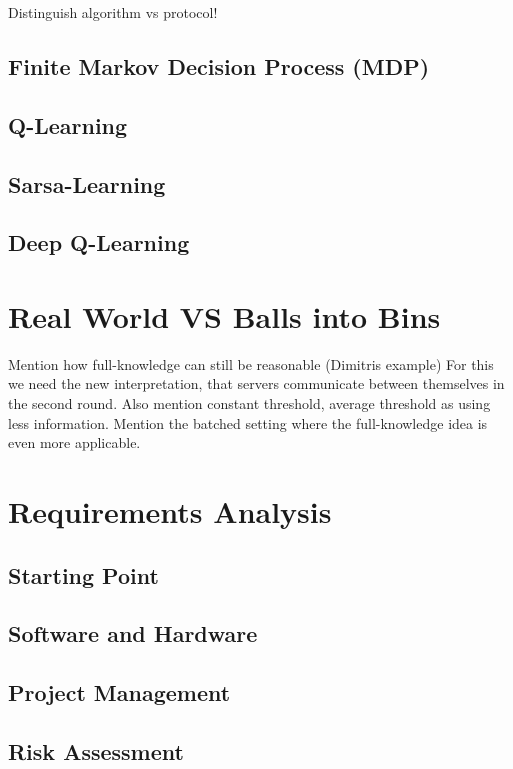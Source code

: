 Distinguish algorithm vs protocol!


\subsection{Finite Markov Decision Process (MDP)}


\subsection{Q-Learning}


\subsection{Sarsa-Learning}


\subsection{Deep Q-Learning}


\section{Real World VS Balls into Bins} \label{alternative}


Mention how full-knowledge can still be reasonable (Dimitris example)
For this we need the new interpretation, that servers communicate between themselves in the second round.
Also mention constant threshold, average threshold as using less information.
Mention the batched setting where the full-knowledge idea is even more applicable.


\section{Requirements Analysis}


\subsection{Starting Point}


\subsection{Software and Hardware}


\subsection{Project Management}


\subsection{Risk Assessment}